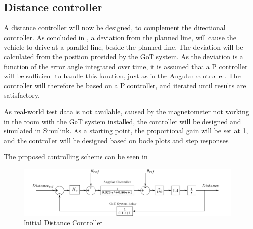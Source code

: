 \subsection{Distance controller}\label{ssec:distanceController}
A distance controller will now be designed, to complement the directional controller.
As concluded in , a deviation from the planned line, will cause the vehicle to drive at a parallel line, beside the planned line. The deviation will be calculated from the position provided by the GoT system. As the deviation is a function of the error angle integrated over time, it is assumed that a P controller will be sufficient to handle this function, just as in the Angular controller. The controller will therefore be based on a P controller, and iterated until results are satisfactory. 

As real-world test data is not available, caused by the magnetometer not working in the room with the GoT system installed, the controller will be designed and simulated in Simulink. As a starting point, the proportional gain will be set at 1, and the controller will be designed based on bode plots and step responses.

The proposed controlling scheme can be seen in 

\begin{figure}[H]
\centering
\includegraphics[width=1.1\textwidth]{figures/steeringFullModel.pdf} 
\caption{Initial Distance Controller}
\label{SteeringSimulink}
\end{figure}\vspace{-5mm}

